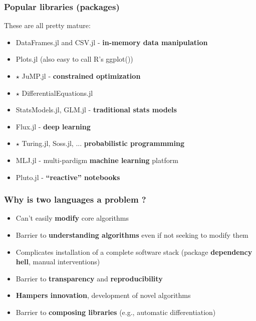 \documentclass[t]{beamer}
\newcommand\df{\bf\color{Maroon}}
\begin{document}


\begin{frame}
  \frametitle{Popular libraries (packages)}
  These are all pretty mature:
  \begin{itemize}
  \item DataFrames.jl and CSV.jl  - {\df in-memory data manipulation}
  \item Plots.jl (also easy to call R's ggplot())
  \item $\star$ JuMP.jl - {\df constrained optimization}
  \item $\star$ DifferentialEquations.jl
  \item StatsModels.jl, GLM.jl - {\df traditional stats models}
  \item Flux.jl  - {\df deep learning}
  \item $\star$ Turing.jl, Soss.jl, ... {\df probabilistic programmming}
  \item MLJ.jl - multi-pardigm {\df machine learning} platform
  \item Pluto.jl - {\df ``reactive'' notebooks}
  \end{itemize}
\end{frame}



\begin{frame}
  \frametitle{Why  is two languages a problem ?}
  \begin{itemize}
    \item Can't easily {\df modify} core algorithms
    \item Barrier to {\df understanding algorithms} even if not seeking to modify them
    \item Complicates installation of a complete software stack
    (package {\df dependency hell}, manual interventions)
    \item Barrier to {\df transparency} and {\df reproducibility}
    \item {\df Hampers innovation}, development of novel algorithms
    \item Barrier to {\df composing libraries} (e.g., automatic differentiation)
  \end{itemize}
\end{frame}
\end{document}

